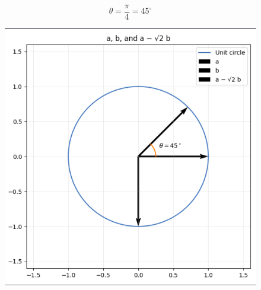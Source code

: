 \documentclass[journal]{IEEEtran}
\begin{document}
\begin{equation}
\boxed{\;\theta=\frac{\pi}{4}=45^\circ\;}
\label{eq:final}
\end{equation}
\begin{figure}[H]
    \centering
    \includegraphics[width=\columnwidth]{figs/mg3plot.png}
\end{figure}
\end{document}
